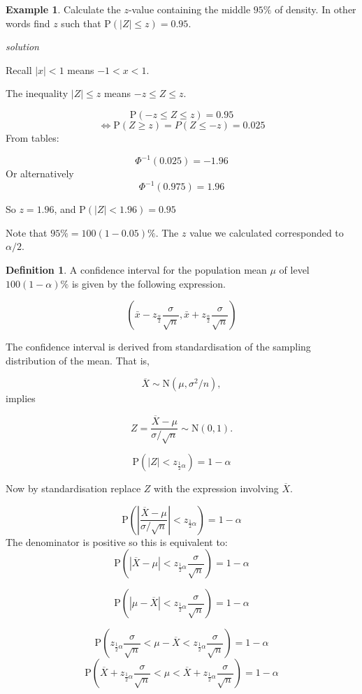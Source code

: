 \documentclass[
]{book}
\theoremstyle{definition}
\newtheorem{definition}{Definition}[chapter]
\theoremstyle{definition}
\newtheorem{example}{Example}[chapter]
\theoremstyle{definition}
\theoremstyle{definition}
\theoremstyle{remark}
\begin{document}
\begin{example}
Calculate the \(z\)-value containing the middle \(95\%\) of density. In other words find \(z\) such that \(\text{P}(|Z|\leq z)=0.95\).

\emph{solution}

Recall \(|x|<1\) means \(-1<x<1\).

The inequality \(|Z|\leq z\) means \(-z\leq Z\leq z\).

\[\text{P}(-z\leq Z \leq z)=0.95\]
\[\iff  \text{P}(Z\geq z) = P(Z\leq -z) =0.025\]
From tables:

\[\Phi^{-1}(0.025) = -1.96\]
Or alternatively \[\Phi^{-1}(0.975) = 1.96\]

So \(z=1.96\), and \(\text{P}(|Z|<1.96) =0.95\)
\end{example}

Note that \(95\% = 100(1-0.05)\%\). The \(z\) value we calculated corresponded to \(\alpha / 2\).

\begin{definition}
A confidence interval for the population mean \(\mu\) of level \(100(1-\alpha)\%\) is given by the following expression.

\[\left( \bar{x}-z_{\frac{\alpha}{2}}\frac{\sigma}{\sqrt{n}},\bar{x}+z_{\frac{\alpha}{2}}\frac{\sigma}{\sqrt{n}} \right)\]
\end{definition}

The confidence interval is derived from standardisation of the sampling distribution of the mean. That is,

\[\overline{X} \sim \text{N} (\mu, \sigma^2/{n}),\]
implies

\[Z = \frac{\overline{X} - \mu}{\sigma / \sqrt{n}} \sim \text{N}(0,1).\]

\[\text{P}\left( |Z| <z_{\frac{1}{2}\alpha} \right) = 1-\alpha\]

Now by standardisation replace \(Z\) with the expression involving \(\overline{X}\).

\[\text{P}\left( \left|\frac{\overline{X} - \mu}{\sigma / \sqrt{n}} \right| <z_{\frac{1}{2}\alpha} \right) = 1-\alpha\]
The denominator is positive so this is equivalent to:
\[\text{P}\left( |\overline{X} - \mu| <z_{\frac{1}{2}\alpha} \frac{\sigma}{\sqrt{n}}  \right) = 1-\alpha\]

\[\text{P}\left( |\mu - \overline{X} | <z_{\frac{1}{2}\alpha} \frac{\sigma}{\sqrt{n}}  \right) = 1-\alpha\]

\[\text{P}\left(z_{\frac{1}{2}\alpha} \frac{\sigma}{\sqrt{n}} < \mu - \overline{X} <z_{\frac{1}{2}\alpha} \frac{\sigma}{\sqrt{n}}  \right) =1-\alpha\]
\[\text{P}\left( \overline{X}+ z_{\frac{1}{2}\alpha} \frac{\sigma}{\sqrt{n}} < \mu <\overline{X} + z_{\frac{1}{2}\alpha} \frac{\sigma}{\sqrt{n}}  \right) =1-\alpha\]
\end{document}
